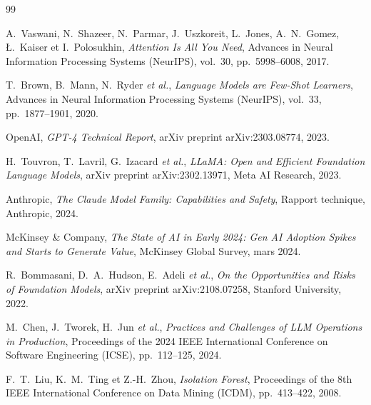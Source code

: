 
\begin{thebibliography}{99}


A.~Vaswani, N.~Shazeer, N.~Parmar, J.~Uszkoreit, L.~Jones, A.~N.~Gomez, Ł.~Kaiser et I.~Polosukhin,
\textit{Attention Is All You Need},
Advances in Neural Information Processing Systems (NeurIPS), vol.~30, pp.~5998--6008, 2017.

T.~Brown, B.~Mann, N.~Ryder \textit{et al.},
\textit{Language Models are Few-Shot Learners},
Advances in Neural Information Processing Systems (NeurIPS), vol.~33, pp.~1877--1901, 2020.

OpenAI,
\textit{GPT-4 Technical Report},
arXiv preprint arXiv:2303.08774, 2023.

H.~Touvron, T.~Lavril, G.~Izacard \textit{et al.},
\textit{LLaMA: Open and Efficient Foundation Language Models},
arXiv preprint arXiv:2302.13971, Meta AI Research, 2023.

Anthropic,
\textit{The Claude Model Family: Capabilities and Safety},
Rapport technique, Anthropic, 2024.


McKinsey \& Company,
\textit{The State of AI in Early 2024: Gen AI Adoption Spikes and Starts to Generate Value},
McKinsey Global Survey, mars 2024.

R.~Bommasani, D.~A.~Hudson, E.~Adeli \textit{et al.},
\textit{On the Opportunities and Risks of Foundation Models},
arXiv preprint arXiv:2108.07258, Stanford University, 2022.

M.~Chen, J.~Tworek, H.~Jun \textit{et al.},
\textit{Practices and Challenges of LLM Operations in Production},
Proceedings of the 2024 IEEE International Conference on Software Engineering (ICSE), pp.~112--125, 2024.


F.~T.~Liu, K.~M.~Ting et Z.-H.~Zhou,
\textit{Isolation Forest},
Proceedings of the 8th IEEE International Conference on Data Mining (ICDM), pp.~413--422, 2008.


\end{thebibliography}
